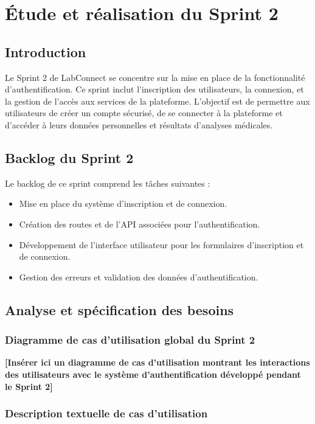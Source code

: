 \documentclass[12pt,a4paper]{report}
\begin{document}
\chapter{Étude et réalisation du Sprint 2}

\section{Introduction}

Le Sprint 2 de LabConnect se concentre sur la mise en place de la fonctionnalité d'authentification. Ce sprint inclut l'inscription des utilisateurs, la connexion, et la gestion de l'accès aux services de la plateforme. L'objectif est de permettre aux utilisateurs de créer un compte sécurisé, de se connecter à la plateforme et d'accéder à leurs données personnelles et résultats d'analyses médicales.

\section{Backlog du Sprint 2}

Le backlog de ce sprint comprend les tâches suivantes :

\begin{itemize}
    \item Mise en place du système d'inscription et de connexion.
    \item Création des routes et de l’API associées pour l’authentification.
    \item Développement de l’interface utilisateur pour les formulaires d’inscription et de connexion.
    \item Gestion des erreurs et validation des données d’authentification.
\end{itemize}

\section{Analyse et spécification des besoins}

\subsection{Diagramme de cas d’utilisation global du Sprint 2}

\textbf{[Insérer ici un diagramme de cas d’utilisation montrant les interactions des utilisateurs avec le système d’authentification développé pendant le Sprint 2]}

\subsection{Description textuelle de cas d’utilisation}
\end{document}
